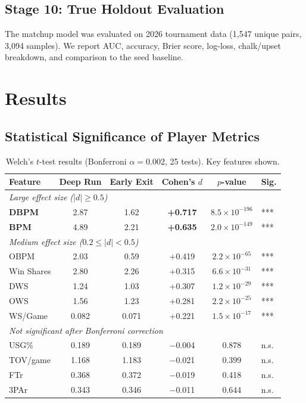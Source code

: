 \documentclass[12pt, a4paper]{article}
\begin{document}
\subsection{Stage 10: True Holdout Evaluation}

The matchup model was evaluated on 2026 tournament data (1,547 unique pairs, 3,094 samples). We report AUC, accuracy, Brier score, log-loss, chalk/upset breakdown, and comparison to the seed baseline.

\section{Results}
\label{sec:results}

\subsection{Statistical Significance of Player Metrics}

\begin{table}[H]
\centering
\caption{Welch's $t$-test results (Bonferroni $\alpha = 0.002$, 25 tests). Key features shown.}
\label{tab:ttest}
\small
\begin{tabular}{@{}lccccl@{}}
\toprule
\textbf{Feature} & \textbf{Deep Run} & \textbf{Early Exit} & \textbf{Cohen's $d$} & \textbf{$p$-value} & \textbf{Sig.} \\
\midrule
\multicolumn{6}{l}{\textit{Large effect size ($|d| \geq 0.5$)}} \\
\textbf{DBPM} & 2.87 & 1.62 & \textbf{+0.717} & $8.5 \times 10^{-196}$ & *** \\
\textbf{BPM}  & 4.89 & 2.21 & \textbf{+0.635} & $2.0 \times 10^{-149}$ & *** \\
\midrule
\multicolumn{6}{l}{\textit{Medium effect size ($0.2 \leq |d| < 0.5$)}} \\
OBPM  & 2.03 & 0.59 & +0.419 & $2.2 \times 10^{-65}$ & *** \\
Win Shares & 2.80 & 2.26 & +0.315 & $6.6 \times 10^{-31}$ & *** \\
DWS   & 1.24 & 1.03 & +0.307 & $1.2 \times 10^{-29}$ & *** \\
OWS   & 1.56 & 1.23 & +0.281 & $2.2 \times 10^{-25}$ & *** \\
WS/Game & 0.082 & 0.071 & +0.221 & $1.5 \times 10^{-17}$ & *** \\
\midrule
\multicolumn{6}{l}{\textit{Not significant after Bonferroni correction}} \\
USG\% & 0.189 & 0.189 & $-$0.004 & 0.878 & n.s. \\
TOV/game & 1.168 & 1.183 & $-$0.021 & 0.399 & n.s. \\
FTr & 0.368 & 0.372 & $-$0.019 & 0.418 & n.s. \\
3PAr & 0.343 & 0.346 & $-$0.011 & 0.644 & n.s. \\
\bottomrule
\end{tabular}
\end{table}
\end{document}
